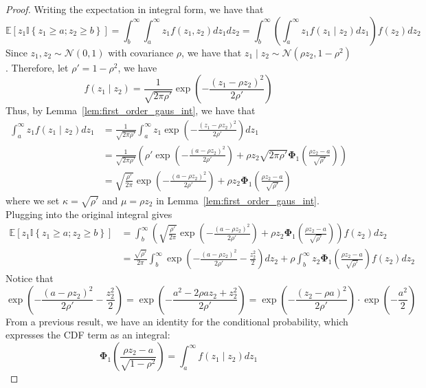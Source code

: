 \documentclass[10pt]{article} %
\theoremstyle{definition}
\theoremstyle{plain}
\newcommand{\paren}[1]{\left(#1\right)}
\newcommand{\indy}[1]{\mathbb{I}\left\{#1\right\}}
\providecommand{\E}{\mathbb{E}}
\begin{document}
\begin{proof}
    Writing the expectation in integral form, we have that
    \[
        \E\left[z_1\indy{z_1\geq a; z_2\geq b}\right] = \int_b^\infty\int_a^\infty z_1 f\paren{z_1, z_2}dz_1dz_2 = \int_b^\infty\paren{\int_a^\infty z_1f\paren{z_1\mid z_2}dz_1}f\paren{z_2}dz_2
    \]
    Since $z_1,z_2\sim\mathcal{N}\paren{0, 1}$ with covariance $\rho$, we have that $z_1\mid z_2\sim\mathcal{N}\paren{\rho z_2,1-\rho^2}$. Therefore, let $\rho' = 1-\rho^2$, we have
    \[
        f\paren{z_1\mid z_2} = \frac{1}{\sqrt{2\pi\rho'}}\exp\paren{-\frac{\paren{z_1-\rho z_2}^2}{2\rho'}}
    \]
    Thus, by Lemma~\ref{lem:first_order_gaus_int}, we have that
    \begin{align*}
        \int_a^\infty z_1f\paren{z_1\mid z_2}dz_1 & = \frac{1}{\sqrt{2\pi\rho'}}\int_a^\infty z_1\exp\paren{-\frac{\paren{z_1-\rho z_2}^2}{2\rho'}}dz_1\\
        & = \frac{1}{\sqrt{2\pi\rho'}}\paren{\rho'\exp\paren{-\frac{\paren{a - \rho z_2}^2}{2\rho'}}+\rho z_2\sqrt{2\pi \rho'}\bm{\Phi}_1\paren{\frac{\rho z_2-a}{\sqrt{\rho'}}}}\\
        & = \sqrt{\frac{\rho'}{2\pi}}\exp\paren{-\frac{\paren{a - \rho z_2}^2}{2\rho'}} + \rho z_2\bm{\Phi}_1\paren{\frac{\rho z_2 - a}{\sqrt{\rho'}}}
    \end{align*}
    where we set $\kappa=\sqrt{\rho'}$ and $\mu = \rho z_2$ in Lemma~\ref{lem:first_order_gaus_int}. Plugging into the original integral gives
    \begin{align*}
        \E\left[z_1\indy{z_1\geq a; z_2\geq b}\right] & = \int_b^\infty\paren{\sqrt{\frac{\rho'}{2\pi}}\exp\paren{-\frac{\paren{a - \rho z_2}^2}{2\rho'}} + \rho z_2\bm{\Phi}_1\paren{\frac{\rho z_2 - a}{\sqrt{\rho'}}}}f\paren{z_2}dz_2\\
        & = \frac{\sqrt{\rho'}}{2\pi}\int_b^\infty\exp\paren{-\frac{\paren{a - \rho z_2}^2}{2\rho'} - \frac{z_2^2}{2}}dz_2 + \rho\int_b^\infty z_2\bm{\Phi}_1\paren{\frac{\rho z_2 - a}{\sqrt{\rho'}}}f\paren{z_2}dz_2
    \end{align*}
    Notice that
    \[
        \exp\paren{-\frac{\paren{a - \rho z_2}^2}{2\rho'} - \frac{z_2^2}{2}} = \exp\paren{-\frac{a^2 - 2\rho az_2 + z_2^2}{2\rho'}} = \exp\paren{-\frac{\paren{z_2 - \rho a}^2}{2\rho'}}\cdot\exp\paren{-\frac{a^2}{2}}
    \]
    From a previous result, we have an identity for the conditional probability, which expresses the CDF term as an integral:
\begin{equation}
    \label{eq:cond_prob}
    \bm{\Phi}_1\left(\frac{\rho z_2 - a}{\sqrt{1-\rho^2}}\right) = \int_a^\infty f(z_1 \mid z_2) dz_1

\end{equation}
\end{proof}
\end{document}
